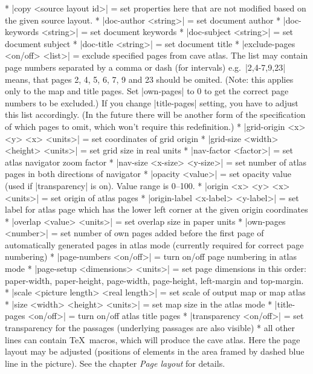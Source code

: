 \comopt 
  * |copy <source layout id>| = set properties here that are not
    modified based on the given source layout.
  * |doc-author <string>| = set document author
  * |doc-keywords <string>| = set document keywords
  * |doc-subject <string>| = set document subject
  * |doc-title <string>| = set document title
  * |exclude-pages <on/off> <list>| = exclude specified pages from cave
    atlas. The list may contain page numbers separated by a comma or dash (for intervals) 
    e.g.~|2,4-7,9,23| means, that pages 2, 4, 5, 6, 7, 9 and 23 should be 
    omited. (Note: this applies only to the map and title pages. Set 
    |own-pages| to 0 to get the correct page numbers to be excluded.) 
    If you change |title-pages| setting, you have to
    adjust this list accordingly. (In the future there will be another form
    of the specification of which pages to omit, which won't require
    this redefinition.)
  * |grid-origin <x> <y> <x> <units>| = set coordinates of grid
    origin
  * |grid-size <width> <height> <units>| = set grid size in real
    units
  * |nav-factor <factor>| = set atlas navigator zoom factor
  * |nav-size <x-size> <y-size>| = set number of atlas pages in
    both directions of navigator
  * |opacity <value>| = set opacity value (used if |transparency| is on). 
    Value range is 0--100.
  * |origin <x> <y> <x> <units>| = set origin of atlas pages
  * |origin-label <x-label> <y-label>| = set label for atlas page
    which has the lower left corner at the given origin coordinates
  * |overlap <value> <units>| = set overlap size in paper units
  * |own-pages <number>| = set number of own pages added before
    the first page of automatically generated pages in atlas mode
    (currently required for correct page numbering)
  * |page-numbers <on/off>| = turn on/off page numbering in atlas mode
  * |page-setup <dimensions> <units>| = set page dimensions in
    this order: paper-width, paper-height, page-width, page-height,
    left-margin and top-margin.
  * |scale <picture length> <real length>| = set scale of
    output map or map atlas
  * |size <width> <height> <units>| = set map size in the atlas mode
  * |title-pages <on/off>| = turn on/off atlas title pages
  * |transparency <on/off>| = set transparency for the passages (underlying 
    passages are also visible)
  * all other lines can contain \TeX\ macros, which will produce
    the cave atlas. Here the page layout may be adjusted (positions
    of elements in the area framed by dashed blue line in the picture).
    See the chapter {\it Page layout} for details.
\endcomopt

